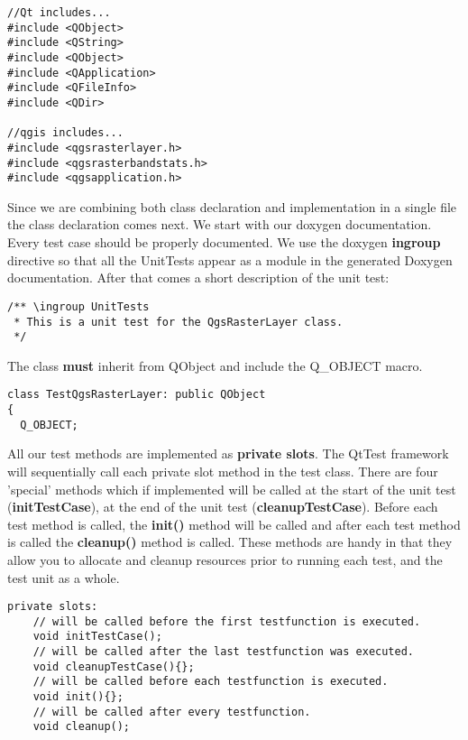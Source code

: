 \begin{verbatim}
//Qt includes...
#include <QObject>
#include <QString>
#include <QObject>
#include <QApplication>
#include <QFileInfo>
#include <QDir>

//qgis includes...
#include <qgsrasterlayer.h> 
#include <qgsrasterbandstats.h> 
#include <qgsapplication.h>
\end{verbatim}

Since we are combining both class declaration and implementation in a single 
file the class declaration comes next. We start with our doxygen documentation. 
Every test case should be properly documented. We use the doxygen \textbf{ingroup} 
directive so that all the UnitTests appear as a module in the generated 
Doxygen documentation. After that comes a short description of the unit test:

\begin{verbatim}
/** \ingroup UnitTests
 * This is a unit test for the QgsRasterLayer class.
 */
\end{verbatim}

The class \textbf{must} inherit from QObject and include the Q\_OBJECT macro.

\begin{verbatim}
class TestQgsRasterLayer: public QObject
{
  Q_OBJECT;
\end{verbatim}

All our test methods are implemented as \textbf{private slots}. The QtTest framework 
will sequentially call each private slot method in the test class. There are 
four 'special' methods which if implemented will be called at the start of 
the unit test (\textbf{initTestCase}), at the end of the unit test (\textbf{cleanupTestCase}). 
Before each test method is called, the \textbf{init()} method will be called and 
after each test method is called the \textbf{cleanup()} method is called. These 
methods are handy in that they allow you to allocate and cleanup resources 
prior to running each test, and the test unit as a whole.

\begin{verbatim}
private slots:
    // will be called before the first testfunction is executed.
    void initTestCase();
    // will be called after the last testfunction was executed.
    void cleanupTestCase(){};
    // will be called before each testfunction is executed.
    void init(){};
    // will be called after every testfunction.
    void cleanup();
\end{verbatim}

